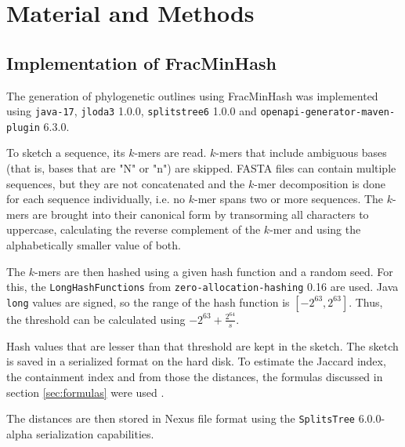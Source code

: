
\chapter{Material and Methods}
  \label{sec:matmet}

\section{Implementation of FracMinHash}
The generation of phylogenetic outlines using FracMinHash was implemented using
\texttt{java-17}, \texttt{jloda3} 1.0.0, \texttt{splitstree6} 1.0.0
\cite{husonApplicationPhylogeneticNetworks2006} and
\texttt{openapi-generator-maven-plugin} 6.3.0.

To sketch a sequence, its $k$-mers are read. $k$-mers that include ambiguous
bases (that is, bases that are "N" or "n") are skipped. FASTA files can contain
multiple sequences, but they are not concatenated and the $k$-mer decomposition
is done for each sequence individually, i.e. no $k$-mer spans two or more
sequences. The $k$-mers are brought into their canonical form
\cite{ondovMashFastGenome2016,irberLightweightCompositionalAnalysis2022} by
transorming all characters to uppercase, calculating the reverse complement of
the $k$-mer and using the alphabetically smaller value of both.

The $k$-mers are then hashed using a given hash function and a random seed. For
this, the \texttt{LongHashFunctions} from \texttt{zero-allocation-hashing} 0.16
are used.  Java \texttt{long} values are signed, so the range
of the hash function is $[-2^{63}, 2^{63}]$. Thus, the threshold can be
calculated using $-2^{63} + \frac{2^{64}}{s}$. 

Hash values that are lesser than that threshold are kept in the sketch. The
sketch is saved in a serialized format on the hard disk. To estimate the Jaccard
index, the containment index and from those the distances, the formulas
discussed in section \ref{sec:formulas} were used
\cite{heraDebiasingFracMinHashDeriving2023,irberLightweightCompositionalAnalysis2022}.

The distances are then stored in Nexus file format using the \texttt{SplitsTree}
6.0.0-alpha \cite{husonApplicationPhylogeneticNetworks2006} serialization
capabilities.


